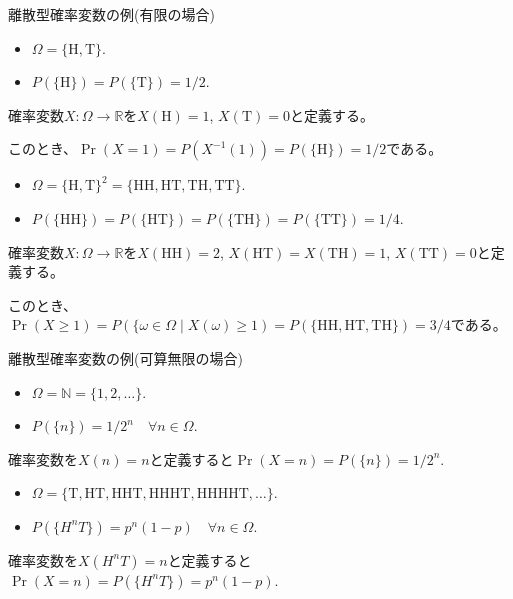 \documentclass[lualatex,handout]{beamer}
\theoremstyle{definition}
\begin{document}
\begin{frame}{離散型確率変数の例(有限の場合)}
\begin{example}
\begin{itemize}
\item $\Omega = \{\mathrm{H},\mathrm{T}\}$.
\item $P(\{\mathrm{H}\})=P(\{\mathrm{T}\})=1/2$.
\end{itemize}

\vspace{1em}
確率変数$X\colon\Omega\to\mathbb{R}$を$X(\mathrm{H})=1$, $X(\mathrm{T})=0$と定義する。

このとき、$\Pr(X = 1) = P(X^{-1}(1)) = P(\{\mathrm{H}\}) = 1/2$である。
\end{example}

\begin{example}
\begin{itemize}
\item $\Omega = \{\mathrm{H},\mathrm{T}\}^2 = \{\mathrm{HH},\mathrm{HT},\mathrm{TH},\mathrm{TT}\}$.
\item $P(\{\mathrm{HH}\})=P(\{\mathrm{HT}\})=P(\{\mathrm{TH}\})=P(\{\mathrm{TT}\})=1/4$.
\end{itemize}

\vspace{1em}
確率変数$X\colon\Omega\to\mathbb{R}$を$X(\mathrm{HH})=2$, $X(\mathrm{HT})=X(\mathrm{TH})=1$, $X(\mathrm{TT})=0$と定義する。

このとき、$\Pr(X \ge 1) = P(\{\omega\in\Omega\mid X(\omega)\ge 1) = P(\{\mathrm{HH},\mathrm{HT},\mathrm{TH}\}) = 3/4$である。
\end{example}
\end{frame}

\begin{frame}{離散型確率変数の例(可算無限の場合)}
\begin{example}
\begin{itemize}
\item $\Omega = \mathbb{N}=\{1,2,\dotsc\}$.
\item $P(\{n\})=1/2^n\quad\forall n\in\Omega$.
\end{itemize}
確率変数を$X(n)=n$と定義すると$\Pr(X=n)=P(\{n\})=1/2^n$.
\end{example}

\begin{example}
\begin{itemize}
\item $\Omega =
\{\mathrm{T},\mathrm{HT},\mathrm{HHT},\mathrm{HHHT},\mathrm{HHHHT},\dotsc\}$.
\item $P(\{H^nT\})=p^n(1-p)\quad\forall n\in\Omega$.
\end{itemize}
確率変数を$X(H^nT)=n$と定義すると$\Pr(X=n)=P(\{H^nT\})=p^n(1-p)$.
\end{example}
\end{frame}
\end{document}
